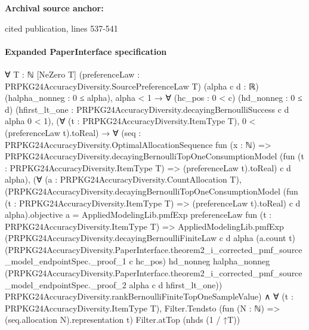 \documentclass[10pt]{article}
\begin{document}
\textbf{Archival source anchor:} {\footnotesize\raggedright cited publication, lines 537-\allowbreak{}541\par}
\paragraph{Expanded PaperInterface specification}
\begin{ReviewVerbatim}
∀ {T : ℕ} [NeZero T] (preferenceLaw : PRPKG24AccuracyDiversity.SourcePreferenceLaw T) (alpha c d : ℝ)
  (halpha_nonneg : 0 ≤ alpha),
  alpha < 1 →
    ∀ (hc_pos : 0 < c) (hd_nonneg : 0 ≤ d)
      (hfirst_lt_one : PRPKG24AccuracyDiversity.decayingBernoulliSuccess c d alpha 0 < 1),
      (∀ (t : PRPKG24AccuracyDiversity.ItemType T), 0 < (preferenceLaw t).toReal) →
        ∀
          (seq :
            PRPKG24AccuracyDiversity.OptimalAllocationSequence fun (x : ℕ) =>
              PRPKG24AccuracyDiversity.decayingBernoulliTopOneConsumptionModel
                (fun (t : PRPKG24AccuracyDiversity.ItemType T) => (preferenceLaw t).toReal) c d alpha),
          (∀ (a : PRPKG24AccuracyDiversity.CountAllocation T),
              (PRPKG24AccuracyDiversity.decayingBernoulliTopOneConsumptionModel
                      (fun (t : PRPKG24AccuracyDiversity.ItemType T) => (preferenceLaw t).toReal) c d alpha).objective
                  a =
                AppliedModelingLib.pmfExp preferenceLaw fun (t : PRPKG24AccuracyDiversity.ItemType T) =>
                  AppliedModelingLib.pmfExp
                    (PRPKG24AccuracyDiversity.decayingBernoulliFiniteLaw c d alpha (a.count t)
                      (PRPKG24AccuracyDiversity.PaperInterface.theorem2_i_corrected_pmf_source_model_endpointSpec._proof_1
                        c hc_pos)
                      hd_nonneg halpha_nonneg
                      (PRPKG24AccuracyDiversity.PaperInterface.theorem2_i_corrected_pmf_source_model_endpointSpec._proof_2
                        alpha c d hfirst_lt_one))
                    PRPKG24AccuracyDiversity.rankBernoulliFiniteTopOneSampleValue) ∧
            ∀ (t : PRPKG24AccuracyDiversity.ItemType T),
              Filter.Tendsto (fun (N : ℕ) => (seq.allocation N).representation t) Filter.atTop (nhds (1 / ↑T))
\end{ReviewVerbatim}
\end{document}
